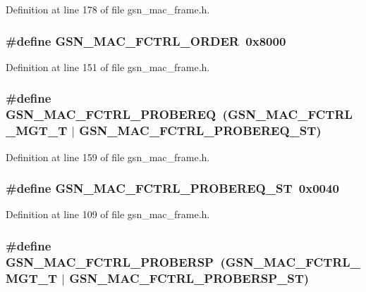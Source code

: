 Definition at line 178 of file gsn\_\-mac\_\-frame.h.

\hypertarget{a00523_ab28d7c55b6e7fa6ab2c513785609fafc}{
\subsubsection[{GSN\_\-MAC\_\-FCTRL\_\-ORDER}]{\setlength{\rightskip}{0pt plus 5cm}\#define GSN\_\-MAC\_\-FCTRL\_\-ORDER~0x8000}}
\label{a00523_ab28d7c55b6e7fa6ab2c513785609fafc}


Definition at line 151 of file gsn\_\-mac\_\-frame.h.

\hypertarget{a00523_a15a46e4c8748a3351108855229ba85cf}{
\subsubsection[{GSN\_\-MAC\_\-FCTRL\_\-PROBEREQ}]{\setlength{\rightskip}{0pt plus 5cm}\#define GSN\_\-MAC\_\-FCTRL\_\-PROBEREQ~(GSN\_\-MAC\_\-FCTRL\_\-MGT\_\-T     $|$ GSN\_\-MAC\_\-FCTRL\_\-PROBEREQ\_\-ST)}}
\label{a00523_a15a46e4c8748a3351108855229ba85cf}


Definition at line 159 of file gsn\_\-mac\_\-frame.h.

\hypertarget{a00523_a1fc57448007137a2bac22714c9f7ca77}{
\subsubsection[{GSN\_\-MAC\_\-FCTRL\_\-PROBEREQ\_\-ST}]{\setlength{\rightskip}{0pt plus 5cm}\#define GSN\_\-MAC\_\-FCTRL\_\-PROBEREQ\_\-ST~0x0040}}
\label{a00523_a1fc57448007137a2bac22714c9f7ca77}


Definition at line 109 of file gsn\_\-mac\_\-frame.h.

\hypertarget{a00523_ab5d32c08db8f92c1d1d27367e420bd5d}{
\subsubsection[{GSN\_\-MAC\_\-FCTRL\_\-PROBERSP}]{\setlength{\rightskip}{0pt plus 5cm}\#define GSN\_\-MAC\_\-FCTRL\_\-PROBERSP~(GSN\_\-MAC\_\-FCTRL\_\-MGT\_\-T     $|$ GSN\_\-MAC\_\-FCTRL\_\-PROBERSP\_\-ST)}}
\label{a00523_ab5d32c08db8f92c1d1d27367e420bd5d}



